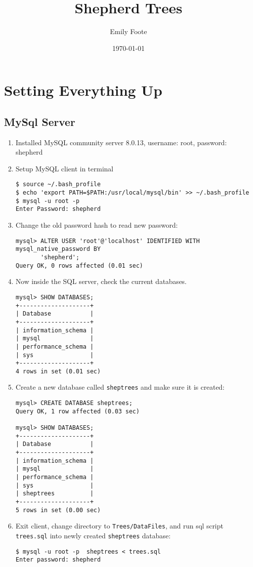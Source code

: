 \documentclass{article}
\title{Shepherd Trees}
\author{Emily Foote}
\date{\today}
\begin{document}
\maketitle

\section{Setting Everything Up}
\subsection{MySql Server}
\begin{enumerate}
    \item Installed MySQL community server 8.0.13, username: root, password: shepherd
    \item Setup MySQL client in terminal \begin{verbatim}
$ source ~/.bash_profile
$ echo 'export PATH=$PATH:/usr/local/mysql/bin' >> ~/.bash_profile
$ mysql -u root -p
Enter Password: shepherd
\end{verbatim}
    \item Change the old password hash to read new password: \begin{verbatim}
mysql> ALTER USER 'root'@'localhost' IDENTIFIED WITH mysql_native_password BY 
       'shepherd'; 
Query OK, 0 rows affected (0.01 sec)
\end{verbatim}
    \item Now inside the SQL server, check the current databases.
\begin{verbatim}
mysql> SHOW DATABASES;
+--------------------+
| Database           |
+--------------------+
| information_schema |
| mysql              |
| performance_schema |
| sys                |
+--------------------+
4 rows in set (0.01 sec)
    \end{verbatim}
    \item  Create a new database called \texttt{sheptrees} and make sure it is created: \begin{verbatim}
mysql> CREATE DATABASE sheptrees; 
Query OK, 1 row affected (0.03 sec)

mysql> SHOW DATABASES;
+--------------------+
| Database           |
+--------------------+
| information_schema |
| mysql              |
| performance_schema |
| sys                |
| sheptrees          |
+--------------------+
5 rows in set (0.00 sec)
\end{verbatim}
    \item  Exit client, change directory to \texttt{Trees/DataFiles}, and run sql script \texttt{trees.sql} into newly created \texttt{sheptrees} database:
\begin{verbatim}
$ mysql -u root -p  sheptrees < trees.sql
Enter password: shepherd
\end{verbatim}
\end{enumerate}
\end{document}
